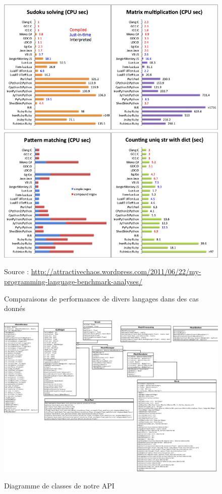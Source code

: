 \documentclass[a4paper]{memoir}
\begin{document}
			\begin{figure}
				\begin{center}
					\includegraphics[scale=0.5]{img/AnalyseLangage1.png}
					\includegraphics[scale=0.5]{img/AnalyseLangage2.png} 
				\end{center}
				\label{fig:analyse}
				\caption{Comparaisons de performances de divers langages dans des cas donnés}
				Source : \url{http://attractivechaos.wordpress.com/2011/06/22/my-programming-language-benchmark-analyses/}
			\end{figure}
			
			\begin{figure}
					\hspace{-2,75cm}\includegraphics{img/diagClass.png}
				\label{fig:diagClass}
				\caption{Diagramme de classes de notre API}
			\end{figure}
			
\end{document}
